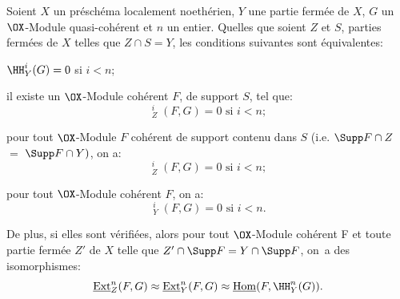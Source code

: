 \begin{proposition} \label{VII.1.2}
Soient $X$ un pr\'esch\'ema localement noeth\'erien, $Y$ une partie ferm\'ee de $X$, $G$ un $\OX$-Module quasi-coh\'erent et $n$ un entier. Quelles que soient $Z$ et $S$, parties ferm\'ees de $X$ telles que $Z \cap S = Y$, les conditions suivantes sont \'equivalentes:
\begin{enumeratei}
\item
$\HH^i_Y (G) = 0$ si $i<n$;

\item
il existe un $\OX$-Module coh\'erent $F$, de support $S$, tel que:
\[
\mathop{\underline{\mathrm{Ext}}}\nolimits^i_Z (F, G) = 0 \text{ si } i<n;\]

\item
pour tout $\OX$-Module $F$ coh\'erent de support contenu dans $S$ (i.e. $\Supp F \cap Z$ $=$ $\Supp F \cap Y)$, on a:
\[
\mathop{\underline{\mathrm{Ext}}}\nolimits^i_{Z}(F, G) = 0 \text{ si } i < n;
\]
\item
pour tout $\OX$-Module coh\'erent $F$, on a:
\[
\mathop{\underline{\mathrm{Ext}}}\nolimits^i_Y (F, G) = 0 \text{ si } i < n.
\]
\end{enumeratei}
\noindent
De plus, si elles sont v\'erifi\'ees, alors pour tout $\OX$-Module coh\'erent F et toute partie ferm\'ee $Z'$ de $X$ telle que $Z' \cap \Supp F = Y \cap \Supp F$, on~a des isomorphismes:
\[
\mathop{\underline{\mathrm{Ext}}}\nolimits^n_{Z} (F, G) \approx \mathop{\underline{\mathrm{Ext}}}\nolimits^n_Y (F, G) \approx \mathop{\underline{\mathrm{Hom}}}\nolimits (F, \HH^n_Y (G)).
\]
\end{proposition}

